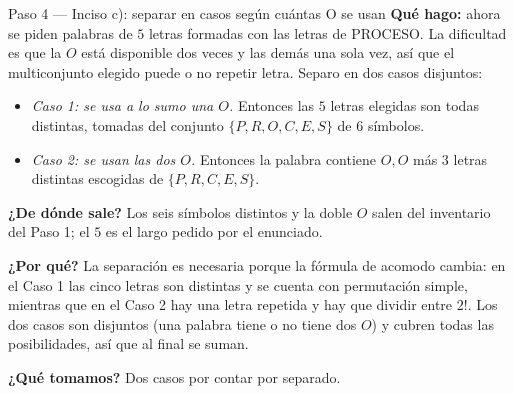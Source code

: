 \documentclass[11pt]{article}
\begin{document}
\begin{paso}{Paso 4 --- Inciso c): separar en casos según cuántas O se usan}
\textbf{Qué hago:} ahora se piden palabras de $5$ letras formadas con las letras de PROCESO. La dificultad es
que la $O$ está disponible dos veces y las demás una sola vez, así que el multiconjunto elegido puede o no
repetir letra. Separo en dos casos disjuntos:
\begin{itemize}[leftmargin=1.4em]
\item \emph{Caso 1: se usa a lo sumo una $O$.} Entonces las $5$ letras elegidas son todas distintas, tomadas
del conjunto $\{P,R,O,C,E,S\}$ de $6$ símbolos.
\item \emph{Caso 2: se usan las dos $O$.} Entonces la palabra contiene $O,O$ más $3$ letras distintas
escogidas de $\{P,R,C,E,S\}$.
\end{itemize}

\textbf{¿De dónde sale?} Los seis símbolos distintos y la doble $O$ salen del inventario del Paso 1; el $5$
es el largo pedido por el enunciado.

\textbf{¿Por qué?} La separación es necesaria porque la fórmula de acomodo cambia: en el Caso 1 las cinco
letras son distintas y se cuenta con permutación simple, mientras que en el Caso 2 hay una letra repetida y
hay que dividir entre $2!$. Los dos casos son disjuntos (una palabra tiene o no tiene dos $O$) y cubren
todas las posibilidades, así que al final se suman.

\textbf{¿Qué tomamos?} Dos casos por contar por separado.
\end{paso}
\end{document}
